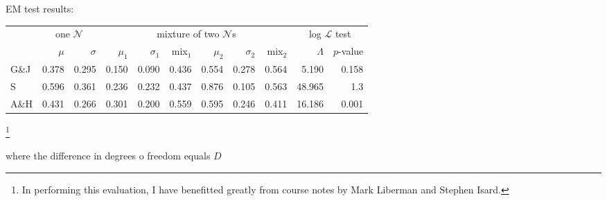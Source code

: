 \begin{example}
EM test results:

\vspace{0.5\baselineskip}
\begin{tabular}{l | r r | r r r r r r | r r}
\toprule
     & \multicolumn{2}{c|}{one $\mathcal{N}$} & \multicolumn{6}{c|}{mixture of two $\mathcal{N}$s} & \multicolumn{2}{c}{log $\mathcal{L}$ test} \\
     & $\mu$ & $\sigma$ & $\mu_1$ & $\sigma_1$ & mix$_1$ & $\mu_2$ & $\sigma_2$ & mix$_2$ & $\Lambda$ & $p$-value  \\
\midrule
G\&J & 0.378 & 0.295    & 0.150   & 0.090      & 0.436     & 0.554   & 0.278    & 0.564     & 5.190    & 0.158   \\
S    & 0.596 & 0.361    & 0.236   & 0.232      & 0.437     & 0.876   & 0.105    & 0.563 & 48.965    & 1.3\e{-10} \\
A\&H & 0.431 & 0.266    & 0.301   & 0.200      & 0.559     & 0.595   & 0.246    & 0.411 & 16.186    & 0.001      \\
\bottomrule
\end{tabular}
\end{example}



\citet{Coltheart1977}

\citet{Hayes2008a}
\citet{Albright2009a}


\citet{EM}

\footnote{In performing this evaluation, I have benefitted greatly from course notes by Mark Liberman and Stephen Isard.}


where the difference in degrees o freedom equals $D$

